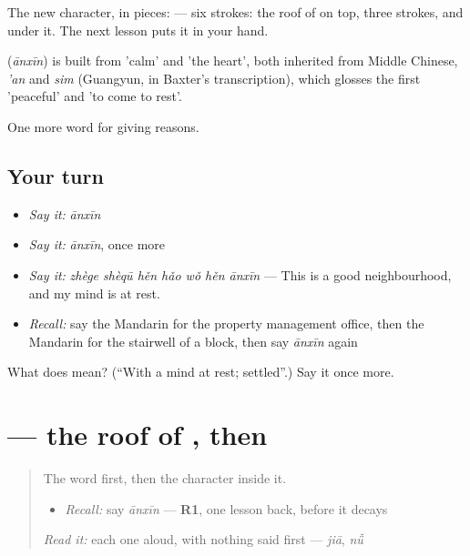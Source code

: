 The new character, in pieces:  — six strokes: the roof of  on top, three strokes, and  under it. The next lesson puts it in your hand.

\begin{cousinweb}
\textbf{} (\emph{ānxīn}) is built from  'calm' and  'the heart', both inherited from Middle Chinese, \emph{'an} and \emph{sim} (Guangyun, in Baxter's transcription), which glosses the first 'peaceful' and 'to come to rest'.
\end{cousinweb}

\begin{grammarlens}[title={What you've built}]
One more word for giving reasons.
\end{grammarlens}

\subsection*{Your turn}
\begin{itemize}
\raggedright
  \item \emph{Say it:} \emph{ānxīn}
  \item \emph{Say it:} \emph{ānxīn}, once more
  \item \emph{Say it:} \emph{zhège shèqū hěn hǎo wǒ hěn ānxīn} — This is a good neighbourhood, and my mind is at rest.
  \item \emph{Recall:} say the Mandarin for the property management office, then the Mandarin for the stairwell of a block, then say \emph{ānxīn} again
\end{itemize}

\begin{tcolorbox}[breakable,colback=teal!4,colframe=teal!35!black,title={Before you move on}]
What does  mean? (\textquotedblleft{}With a mind at rest; settled\textquotedblright{}.) Say it once more.
\end{tcolorbox}
\section[\texorpdfstring{\zh{安} (ān)}{安 (ān)}]{ — the roof of , then }

\label{lesson:ZH-W379-an-calm}



\begin{quote}
The word first, then the character inside it.

\begin{itemize}
\raggedright
  \item \emph{Recall:} say \emph{ānxīn} — \textbf{R1}, one lesson back, before it decays
\end{itemize}

\begin{quote}
 
\end{quote}

\emph{Read it:} each one aloud, with nothing said first — \emph{jiā}, \emph{nǚ}
\end{quote}

